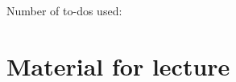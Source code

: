 \documentclass[12pt]{book}
\newcounter{todocounter}
\begin{document}
\mainmatter






\renewcommand\chaptername{Case Study}
\renewcommand\cftchappresnum{{Case Study}\space}












\appendix









\backmatter







\newpage

Number of to-dos used: \thetodocounter







\chapter*{Material for lecture}
\end{document}
